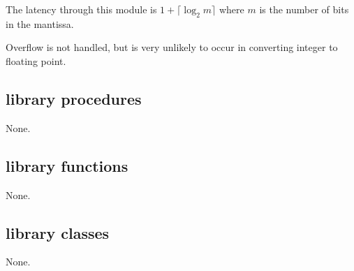             The latency through this module is $1 + \lceil \log_2 m \rceil$
            where $m$ is the number of bits in the mantissa.
            
            Overflow is not handled, but is very unlikely to occur in converting
            integer to floating point.





    \subsection{library procedures}
    
        None.




    \subsection{library functions}
    

        None.


    \subsection{library classes}
    
        None.
